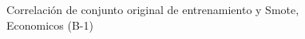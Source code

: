 \begin{figure}[H]
    \centering
    
    \caption{Correlación de conjunto original de entrenamiento y Smote, Economicos (B-1)}
    \label{pairwise-economicos-b-1-smote-enc}
\end{figure}